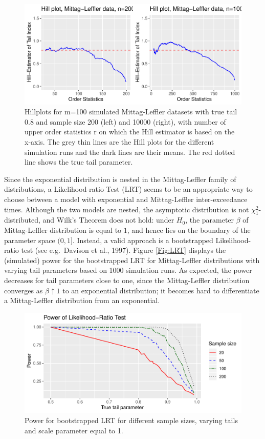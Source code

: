 \documentclass[]{elsarticle} %
\begin{document}
\begin{figure}

{\centering \includegraphics[width=0.5\linewidth]{article_springer_files/figure-latex/Hillplots-1} 

}

\caption{\label{fig:Hillplots} Hillplots for m=100 simulated Mittag-Leffler datasets with true tail 0.8 and sample size 200 (left) and 10000 (right), with number of upper order statistics r on which the Hill estimator is based on the x-axis. The grey thin lines are the Hill plots for the different simulation runs and the dark lines are their means. The red dotted line shows the true tail parameter. }\label{fig:Hillplots}
\end{figure}

Since the exponential distribution is nested in the Mittag-Leffler
family of distributions, a Likelihood-ratio Test (LRT) seems to be an
appropriate way to choose between a model with exponential and
Mittag-Leffler inter-exceedance times. Although the two models are
nested, the asymptotic distribution is not \(\chi^2_1\)-distributed, and
Wilk's Theorem does not hold: under \(H_0\), the parameter \(\beta\) of
Mittag-Leffler distribution is equal to \(1\), and hence lies on the
boundary of the parameter space \((0,1]\). Instead, a valid approach is
a bootstrapped Likelihood-ratio test (see e.g.~Davison et al., 1997).
Figure \ref{Fig:LRT} displays the (simulated) power for the bootstrapped
LRT for Mittag-Leffler distributions with varying tail parameters based
on 1000 simulation runs. As expected, the power decreases for tail
parameters close to one, since the Mittag-Leffler distribution converges
as \(\beta \uparrow 1\) to an exponential distribution; it becomes hard
to differentiate a Mittag-Leffler distribution from an exponential.

\begin{figure}

{\centering \includegraphics[width=0.9\linewidth]{article_springer_files/figure-latex/LRT_power-1} 

}

\caption{\label{Fig:LRT} Power for bootstrapped LRT for different sample sizes, varying tails and scale parameter equal to 1.}\label{fig:LRT_power}
\end{figure}
\end{document}
